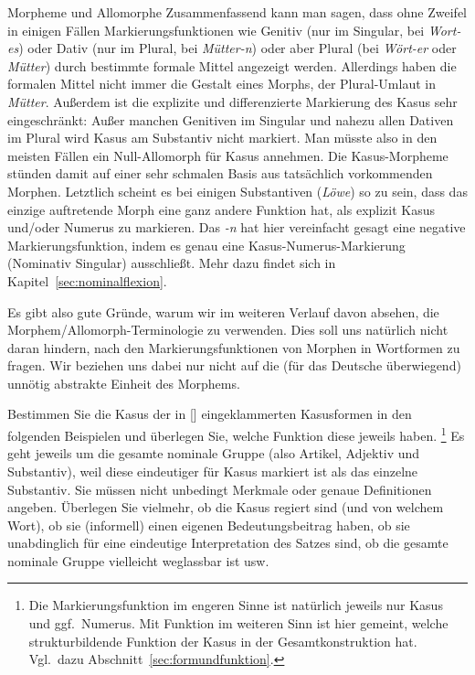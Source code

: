 \begin{Vertiefung}{Morpheme und Allomorphe}
Zusammenfassend kann man sagen, dass ohne Zweifel in einigen Fällen Markierungsfunktionen wie Genitiv (nur im Singular, \zB bei \textit{Wort-es}) oder Dativ (nur im Plural, \zB bei \textit{Mütter-n}) oder aber Plural (\zB bei \textit{Wört-er} oder \textit{Mütter}) durch bestimmte formale Mittel angezeigt werden.
Allerdings haben die formalen Mittel nicht immer die Gestalt eines Morphs, \zB der Plural-Umlaut in \textit{Mütter}.
Außerdem ist die explizite und differenzierte Markierung des Kasus sehr eingeschränkt:
Außer manchen Genitiven im Singular und nahezu allen Dativen im Plural wird Kasus am Substantiv nicht markiert.
Man müsste also in den meisten Fällen ein Null-Allomorph für Kasus annehmen.
Die Kasus-Morpheme stünden damit auf einer sehr schmalen Basis aus tatsächlich vorkommenden Morphen.
Letztlich scheint es bei einigen Substantiven (\zB \textit{Löwe}) so zu sein, dass das einzige auftretende Morph eine ganz andere Funktion hat, als explizit Kasus und\slash oder Numerus zu markieren.
Das \textit{-n} hat hier vereinfacht gesagt eine negative Markierungsfunktion, indem es genau eine Kasus-Numerus-Markierung (Nominativ Singular) ausschließt.
Mehr dazu findet sich in Kapitel~\ref{sec:nominalflexion}.


Es gibt also gute Gründe, warum wir im weiteren Verlauf davon absehen, die Morphem\slash Allomorph-Terminologie zu verwenden.
Dies soll uns natürlich nicht daran hindern, nach den Markierungsfunktionen von Morphen in Wortformen zu fragen.
Wir beziehen uns dabei nur nicht auf die (für das Deutsche überwiegend) unnötig abstrakte Einheit des Morphems.

\end{Vertiefung}

\Uebungen

\Uebung[\tristar]{} \label{exc:morphologie01} Bestimmen Sie die Kasus der in [] eingeklammerten Kasusformen in den folgenden Beispielen und überlegen Sie, welche Funktion diese jeweils haben.%
\footnote{Die Markierungsfunktion im engeren Sinne ist natürlich jeweils nur Kasus und ggf.\ Numerus.
Mit Funktion im weiteren Sinn ist hier gemeint, welche strukturbildende Funktion der Kasus in der Gesamtkonstruktion hat.
Vgl.\ dazu Abschnitt~\ref{sec:formundfunktion}.}
Es geht jeweils um die gesamte nominale Gruppe (also Artikel, Adjektiv und Substantiv), weil diese eindeutiger für Kasus markiert ist als das einzelne Substantiv.
Sie müssen nicht unbedingt Merkmale oder genaue Definitionen angeben.
Überlegen Sie vielmehr, ob die Kasus regiert sind (und von welchem Wort), ob sie (informell) einen eigenen Bedeutungsbeitrag haben, ob sie unabdinglich für eine eindeutige Interpretation des Satzes sind, ob die gesamte nominale Gruppe vielleicht weglassbar ist usw.

